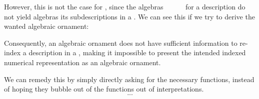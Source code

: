 However, this is not the case for , since the algebras \ \ \ \ \  for a description  do not yield algebras its subdescriptions in a . We can see this if we try to derive the wanted algebraic ornament:

Consequently, an algebraic ornament does not have sufficient information to re-index a description  in a , making it impossible to present the intended indexed numerical representation as an algebraic ornament.

We can remedy this by simply directly asking for the necessary functions, instead of hoping they bubble out of the functions out of interpretations.
\[ ... \]









